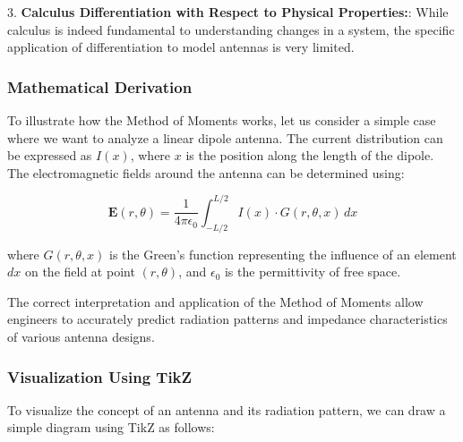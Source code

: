 3. \textbf{Calculus Differentiation with Respect to Physical Properties:}: While calculus is indeed fundamental to understanding changes in a system, the specific application of differentiation to model antennas is very limited.

\subsubsection{Mathematical Derivation}

To illustrate how the Method of Moments works, let us consider a simple case where we want to analyze a linear dipole antenna. The current distribution can be expressed as \(I(x)\), where \(x\) is the position along the length of the dipole. The electromagnetic fields around the antenna can be determined using:

\[
\mathbf{E}(r, \theta) = \frac{1}{4\pi\epsilon_0} \int_{-L/2}^{L/2} I(x) \cdot G(r, \theta, x) \, dx
\]

where \(G(r, \theta, x)\) is the Green's function representing the influence of an element \( dx \) on the field at point \( (r, \theta) \), and \(\epsilon_0\) is the permittivity of free space.

The correct interpretation and application of the Method of Moments allow engineers to accurately predict radiation patterns and impedance characteristics of various antenna designs.

\subsubsection{Visualization Using TikZ}

To visualize the concept of an antenna and its radiation pattern, we can draw a simple diagram using TikZ as follows:

\begin{center}
\end{center}
